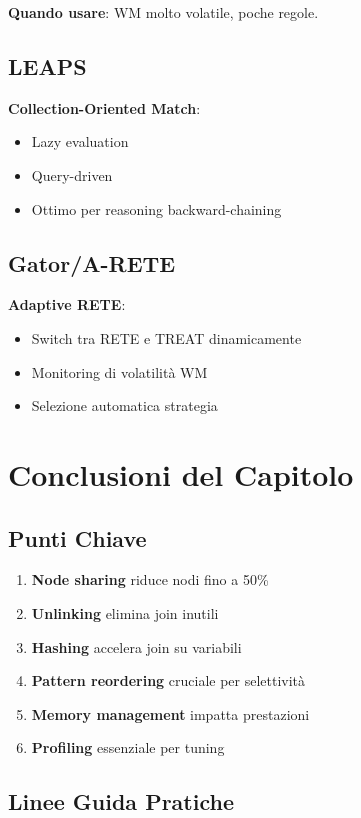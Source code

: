\textbf{Quando usare}: WM molto volatile, poche regole.

\subsection{LEAPS}

\textbf{Collection-Oriented Match}:
\begin{itemize}
\item Lazy evaluation
\item Query-driven
\item Ottimo per reasoning backward-chaining
\end{itemize}

\subsection{Gator/A-RETE}

\textbf{Adaptive RETE}:
\begin{itemize}
\item Switch tra RETE e TREAT dinamicamente
\item Monitoring di volatilità WM
\item Selezione automatica strategia
\end{itemize}

\section{Conclusioni del Capitolo}

\subsection{Punti Chiave}

\begin{enumerate}
\item \textbf{Node sharing} riduce nodi fino a 50\%
\item \textbf{Unlinking} elimina join inutili
\item \textbf{Hashing} accelera join su variabili
\item \textbf{Pattern reordering} cruciale per selettività
\item \textbf{Memory management} impatta prestazioni
\item \textbf{Profiling} essenziale per tuning
\end{enumerate}

\subsection{Linee Guida Pratiche}

